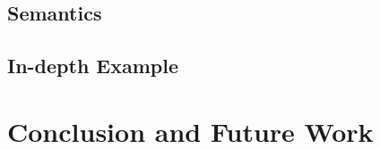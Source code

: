 \documentclass{llncs}
\begin{document}
\subsection{Semantics}\label{sec:semantics}

\subsection{In-depth Example}

\section{Conclusion and Future Work}

%
%



\end{document}
